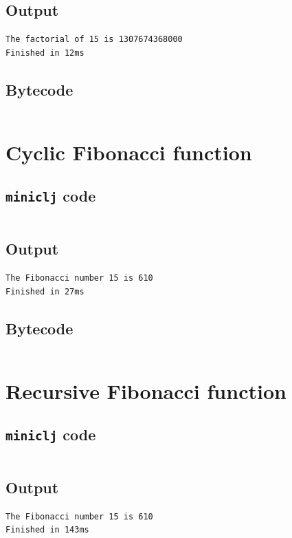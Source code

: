 \documentclass[11pt]{scrreprt}
\begin{document}
\subsection{Output}
\begin{verbatim}
The factorial of 15 is 1307674368000
Finished in 12ms
\end{verbatim}

\subsection{Bytecode}
\inputminted{text}{/home/mario/git/MarioJim/miniclj/examples/reduce_factorial.mclj}


\section{Cyclic Fibonacci function}
\subsection{\texttt{miniclj} code}
\inputminted{clojure}{/home/mario/git/MarioJim/miniclj/examples/cyclic_fibonacci.clj}

\subsection{Output}
\begin{verbatim}
The Fibonacci number 15 is 610
Finished in 27ms
\end{verbatim}

\subsection{Bytecode}
\inputminted{text}{/home/mario/git/MarioJim/miniclj/examples/cyclic_fibonacci.mclj}


\section{Recursive Fibonacci function}
\subsection{\texttt{miniclj} code}
\inputminted{clojure}{/home/mario/git/MarioJim/miniclj/examples/recursive_fibonacci.clj}

\subsection{Output}
\begin{verbatim}
The Fibonacci number 15 is 610
Finished in 143ms
\end{verbatim}
\end{document}
